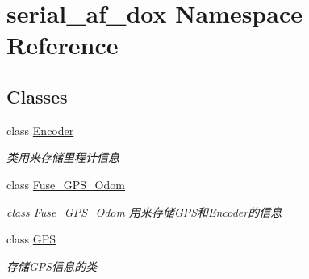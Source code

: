 \hypertarget{namespaceserial__af__dox}{}\section{serial\+\_\+af\+\_\+dox Namespace Reference}
\label{namespaceserial__af__dox}
\subsection*{Classes}
\begin{DoxyCompactItemize}
\item 
class \hyperlink{classserial__af__dox_1_1_encoder}{Encoder}
\begin{DoxyCompactList}\small\item\em 类用来存储里程计信息 \end{DoxyCompactList}\item 
class \hyperlink{classserial__af__dox_1_1_fuse___g_p_s___odom}{Fuse\+\_\+\+G\+P\+S\+\_\+\+Odom}
\begin{DoxyCompactList}\small\item\em class \hyperlink{classserial__af__dox_1_1_fuse___g_p_s___odom}{Fuse\+\_\+\+G\+P\+S\+\_\+\+Odom} 用来存储\+G\+P\+S和\+Encoder的信息 \end{DoxyCompactList}\item 
class \hyperlink{classserial__af__dox_1_1_g_p_s}{G\+PS}
\begin{DoxyCompactList}\small\item\em 存储\+G\+P\+S信息的类 \end{DoxyCompactList}\end{DoxyCompactItemize}
